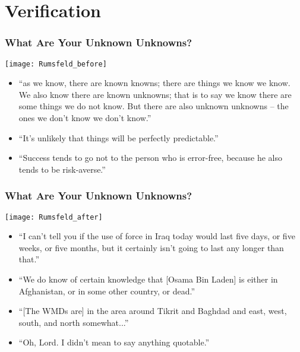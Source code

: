 \section{Verification}

\begin{frame}
\frametitle{What Are Your Unknown Unknowns?}

\begin{center}
\texttt{[image: Rumsfeld\_before]}
\end{center}

\begin{itemize}
\item ``as we know, there are known knowns; there are things we know we know.
We also know there are known unknowns; that is to say we know there
are some things we do not know. But there are also unknown unknowns --
the ones we don't know we don't know.''

\item ``It’s unlikely that things will be perfectly predictable.''

\item ``Success tends to go not to the person who is error-free, because he
also tends to be risk-averse.''
\end{itemize}

\end{frame}

\begin{frame}
\frametitle{What Are Your Unknown Unknowns?}

\begin{center}
\texttt{[image: Rumsfeld\_after]}
\end{center}

\begin{itemize}

\item {\scriptsize ``I can't tell you if the use of force in Iraq today would last
five days, or five weeks, or five months, but it certainly isn't going
to last any longer than that.''}

\item {\footnotesize ``We do know of certain knowledge that [Osama Bin
Laden] is either in Afghanistan, or in some other country, or dead.''}

\item {\small ``[The WMDs are] in the area around Tikrit and
Baghdad and east, west, south, and north somewhat...''}

\item {``Oh, Lord. I didn't mean to say anything quotable.''}

\end{itemize}

\end{frame}

